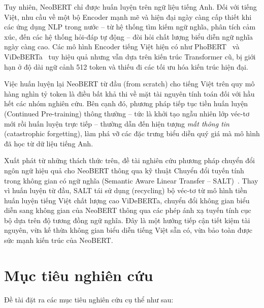 Tuy nhiên, NeoBERT chỉ được huấn luyện trên ngữ liệu tiếng Anh. Đối với tiếng Việt,
nhu cầu về một bộ Encoder mạnh mẽ và hiện đại ngày càng cấp thiết khi các ứng dụng
NLP trong nước -- từ hệ thống tìm kiếm ngữ nghĩa, phân tích cảm xúc, đến các hệ
thống hỏi-đáp tự động -- đòi hỏi chất lượng biểu diễn ngữ nghĩa ngày càng cao. Các
mô hình Encoder tiếng Việt hiện có như PhoBERT~\cite{nguyen2020phobert} và
ViDeBERTa~\cite{lai2023videberta} tuy hiệu quả nhưng vẫn dựa trên kiến trúc
Transformer cũ, bị giới hạn ở độ dài ngữ cảnh 512 token và thiếu đi các tối ưu hóa
kiến trúc hiện đại.

Việc huấn luyện lại NeoBERT từ đầu (from scratch) cho tiếng Việt trên quy mô hàng
nghìn tỷ token là điều bất khả thi về mặt tài nguyên tính toán đối với hầu hết các
nhóm nghiên cứu. Bên cạnh đó, phương pháp tiếp tục tiền huấn luyện (Continued
Pre-training) thông thường -- tức là khởi tạo ngẫu nhiên lớp véc-tơ mới rồi huấn
luyện trực tiếp -- thường dẫn đến hiện tượng \textit{mất thông tin} (catastrophic
forgetting), làm phá vỡ các đặc trưng biểu diễn quý giá mà mô hình đã học từ dữ
liệu tiếng Anh.

Xuất phát từ những thách thức trên, đề tài nghiên cứu phương pháp chuyển đổi ngôn
ngữ hiệu quả cho NeoBERT thông qua kỹ thuật Chuyển đổi tuyến tính trong không gian
có ngữ nghĩa (Semantic Aware Linear Transfer -- SALT)~\cite{lee2025salt}. Thay vì huấn luyện từ đầu, SALT tái sử dụng
(recycling) bộ véc-tơ từ mô hình tiền huấn luyện tiếng Việt chất lượng cao
ViDeBERTa, chuyển đổi không gian biểu diễn sang không gian của NeoBERT thông qua
các phép ánh xạ tuyến tính cục bộ dựa trên độ tương đồng ngữ nghĩa. Đây là một hướng tiếp cận
tiết kiệm tài nguyên, vừa kế thừa không gian biểu diễn tiếng Việt sẵn có, vừa
bảo toàn được sức mạnh kiến trúc của NeoBERT.

\section{Mục tiêu nghiên cứu}
\label{sec:objectives}

Đề tài đặt ra các mục tiêu nghiên cứu cụ thể như sau:

